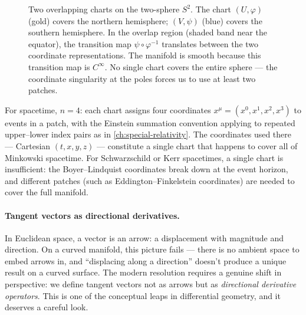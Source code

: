 \begin{figure}[htbp]
  \centering
  
  \caption[Overlapping charts on the two-sphere $S^2$]{Two overlapping charts on the two-sphere $S^2$.  The chart
    $(U, \varphi)$ (gold) covers the northern hemisphere; $(V, \psi)$ (blue)
    covers the southern hemisphere.  In the overlap region (shaded band near
    the equator), the transition map $\psi \circ \varphi^{-1}$ translates
    between the two coordinate representations.  The manifold is smooth
    because this transition map is $C^\infty$.  No single chart covers the
    entire sphere --- the coordinate singularity at the poles forces us to
    use at least two patches.}
  \label{fig:manifold-charts}
\end{figure}

For spacetime, $n = 4$: each chart assigns four coordinates $x^\mu =
(x^0, x^1, x^2, x^3)$ to events in a patch, with the Einstein summation
convention applying to repeated upper--lower index pairs as in
\cref{ch:special-relativity}.  The coordinates used there --- Cartesian
$(t, x, y, z)$ --- constitute a single chart that happens to cover all of
Minkowski spacetime.  For Schwarzschild or Kerr spacetimes, a single chart is
insufficient: the Boyer--Lindquist coordinates break down at the event horizon,
and different patches (such as Eddington--Finkelstein coordinates) are needed to
cover the full manifold.

\paragraph{Tangent vectors as directional derivatives.}

In Euclidean space, a vector is an arrow: a displacement with magnitude and
direction.  On a curved manifold, this picture fails --- there is no ambient
space to embed arrows in, and ``displacing along a direction'' doesn't produce
a unique result on a curved surface.  The modern resolution requires a genuine
shift in perspective: we define tangent vectors not as arrows but as
\emph{directional derivative operators}.  This is one of the conceptual leaps
in differential geometry, and it deserves a careful look.

